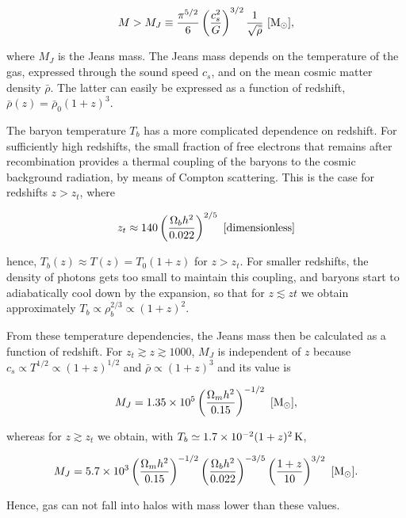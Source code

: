 \documentclass[a4paper,11pt]{article}
\begin{document}
\begin{align*}
    M > M_J \equiv \frac{\pi^{5/2}}{6}\left(\frac{c_s^2}{G}\right)^{3/2}\frac{1}{\sqrt{\bar{\rho}}} ~ [{\rm M_\odot}],
\end{align*}

{\noindent}where $M_J$ is the Jeans mass. The Jeans mass depends on the temperature of the gas, expressed through the sound speed $c_s$, and on the mean cosmic matter density $\bar{\rho}$. The latter can easily be expressed as a function of redshift, $\bar{\rho}(z) = \bar{\rho}_0(1+z)^3$.

{\noindent}The baryon temperature $T_b$ has a more complicated dependence on redshift. For sufficiently high redshifts, the small fraction of free electrons that remains after recombination provides a thermal coupling of the baryons to the cosmic background radiation, by means of Compton scattering. This is the case for redshifts $z>z_t$, where

\begin{align*}
    z_t \approx 140\left(\frac{\Omega_bh^2}{0.022}\right)^{2/5} ~ [{\rm dimensionless}]
\end{align*}

{\noindent}hence, $T_b(z)\approx T(z)=T_0(1+z)$ for $z>z_t$. For smaller redshifts, the density of photons gets too small to maintain this coupling, and baryons start to adiabatically cool down by the expansion, so that for $z\lesssim zt$ we obtain approximately $T_b\propto\rho_b^{2/3}\propto(1+z)^2$.

{\noindent}From these temperature dependencies, the Jeans mass then be calculated as a function of redshift. For $z_t\gtrsim z\gtrsim 1000$, $M_J$ is independent of $z$ because $c_s
\propto T^{1/2}\propto(1+z)^{1/2}$ and $\bar{\rho}\propto(1+z)^3$ and its value is

\begin{align*}
    M_J = 1.35\times10^5 \left(\frac{\Omega_mh^2}{0.15}\right)^{-1/2} ~ [{\rm M_\odot}],
\end{align*}

{\noindent}whereas for $z\gtrsim z_t$ we obtain, with $T_b\simeq1.7\times10^{-2}(1+z)^2\,{\rm K}$,

\begin{align*}
    M_J = 5.7\times10^3 \left(\frac{\Omega_mh^2}{0.15}\right)^{-1/2} \left(\frac{\Omega_bh^2}{0.022}\right)^{-3/5}\left(\frac{1+z}{10}\right)^{3/2} ~ [{\rm M_\odot}].
\end{align*}

{\noindent}Hence, gas can not fall into halos with mass lower than these values.
\end{document}
